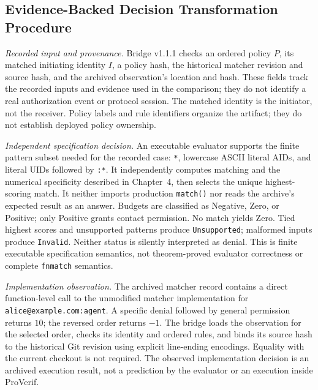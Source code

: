 
\subsection{Evidence-Backed Decision Transformation Procedure}
\label{sec:implementation-mapping}

\emph{Recorded input and provenance.} Bridge v1.1.1 checks an ordered policy
$P$, its matched initiating identity $I$, a policy hash, the historical
matcher revision and source hash, and the archived observation's location
and hash. These fields track the recorded inputs and evidence used in the
comparison; they do not identify a real authorization event or protocol
session. The matched identity is the initiator, not the receiver.
Policy labels and rule identifiers organize the artifact; they do not
establish deployed policy ownership.

\emph{Independent specification decision.} An executable evaluator supports
the finite pattern subset needed for the recorded case: \texttt{*},
lowercase ASCII literal AIDs, and literal UIDs followed by \texttt{:*}.
It independently computes matching and the numerical specificity described
in Chapter~4, then selects the unique highest-scoring match. It neither
imports production \texttt{match()} nor reads the archive's expected result
as an answer. Budgets are classified as Negative, Zero, or Positive; only
Positive grants contact permission. No match yields Zero. Tied highest
scores and unsupported patterns produce \texttt{Unsupported}; malformed
inputs produce \texttt{Invalid}. Neither status is silently interpreted as
denial. This is finite executable specification semantics, not theorem-proved
evaluator correctness or complete \texttt{fnmatch} semantics.

\emph{Implementation observation.} The archived matcher record contains a direct
function-level call to the unmodified matcher implementation for
\texttt{alice@\allowbreak example.com:\allowbreak agent}. A specific denial followed
by general permission returns $10$; the reversed order returns $-1$.
The bridge loads the observation for the selected order, checks its identity
and ordered rules, and binds its source hash to the historical Git revision
using explicit line-ending encodings. Equality with the current checkout is
not required. The observed implementation decision is an archived execution result,
not a prediction by the evaluator or an execution inside ProVerif.

